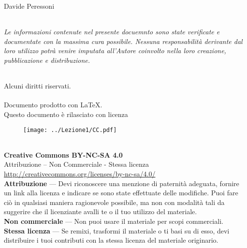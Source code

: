  Davide Peressoni\\~\par
    \emph{Le informazioni contenute nel presente docuemnto sono state verificate e documentate con la massima cura possibile. Nessuna responsabilità derivante dal loro utilizzo potrà venire imputata all’Autore coinvolto nella loro creazione, pubblicazione e distribuzione.}\\~\par
    Alcuni diritti riservati.\\~\\
    Documento prodotto con \LaTeX.\\
    Questo documento è rilasciato con licenza\\
    \begin{figure}[!ht]
	\centering
	    \texttt{[image: ../Lezione1/CC.pdf]}
    \end{figure}~\\
    \textbf{Creative Commons BY-NC-SA 4.0}\\
    Attribuzione – Non Commerciale - Stessa licenza\\
    \url{http://creativecommons.org/licenses/by-nc-sa/4.0/}\\
    \textbf{Attribuzione} — Devi riconoscere una menzione di paternità adeguata, fornire un link alla licenza e indicare se sono state effettuate delle modifiche. Puoi
    fare ciò in qualsiasi maniera ragionevole possibile, ma non con modalità tali da suggerire che il licenziante avalli te o il tuo utilizzo del materiale.\\
    \textbf{Non commerciale} — Non puoi usare il materiale per scopi commerciali.\\
    \textbf{Stessa licenza} — Se remixi, trasformi il materiale o ti basi su di esso, devi distribuire i tuoi contributi con la stessa licenza del materiale originario.